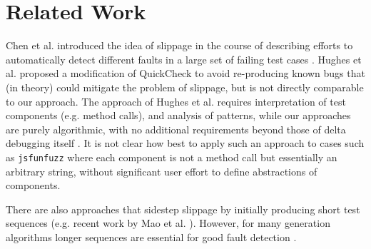 \section{Related Work}

Chen et al. introduced the idea of slippage in the course of
describing efforts to automatically detect different faults in a large
set of failing test cases \cite{PLDI13}.  Hughes et
al. \cite{FindMoreBugs} proposed a modification of QuickCheck
\cite{ClaessenH00} to avoid re-producing known bugs that (in theory)
could mitigate the problem of slippage, but is not directly comparable
to our approach.  The approach of Hughes et al. requires
interpretation of test components (e.g. method calls), and analysis of
patterns, while our approaches are purely algorithmic, with no
additional requirements beyond those of delta debugging itself
\cite{DD}.  It is not clear how best to apply such an approach
 to cases such as {\tt jsfunfuzz} where each component is not a
method call but essentially an arbitrary string, without significant
user effort to define abstractions of components.

There are also approaches that sidestep slippage by initially
producing short test sequences (e.g. recent work by Mao et
al. \cite{Mao}).  However, for many generation algorithms
longer sequences are essential for good fault detection \cite{ASE08,LongBetter}.